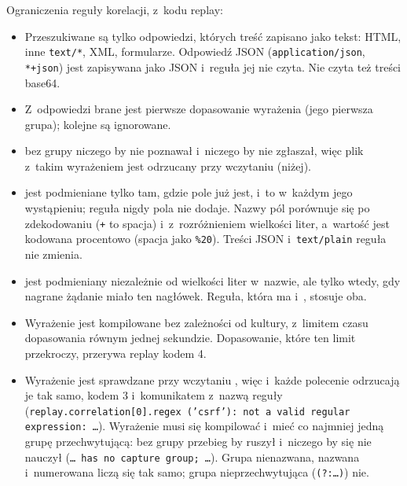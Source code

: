 Ograniczenia reguły korelacji, z~kodu replay:
\begin{itemize}
  \item Przeszukiwane są tylko odpowiedzi, których treść zapisano jako tekst: HTML, inne
        \texttt{text/*}, XML, formularze. Odpowiedź JSON (\texttt{application/json},
        \texttt{*+json}) jest zapisywana jako JSON i~reguła jej nie czyta. Nie czyta też
        treści base64.
  \item Z~odpowiedzi brane jest pierwsze dopasowanie wyrażenia (jego pierwsza grupa);
        kolejne są ignorowane.
  \item {} bez grupy niczego by nie poznawał i~niczego by nie zgłaszał, więc
        plik z~takim wyrażeniem jest odrzucany przy wczytaniu (niżej).
  \item {} jest podmieniane tylko tam, gdzie pole już jest, i~to w~każdym
        jego wystąpieniu; reguła nigdy pola nie dodaje. Nazwy pól porównuje się po
        zdekodowaniu (\texttt{+} to spacja) i~z~rozróżnieniem wielkości liter, a~wartość
        jest kodowana procentowo (spacja jako \texttt{\%20}). Treści JSON
        i~\texttt{text/plain} reguła nie zmienia.
  \item {} jest podmieniany niezależnie od wielkości liter w~nazwie, ale
        tylko wtedy, gdy nagrane żądanie miało ten nagłówek. Reguła, która ma
         i~, stosuje oba.
  \item Wyrażenie jest kompilowane bez zależności od kultury, z~limitem czasu dopasowania
        równym jednej sekundzie. Dopasowanie, które ten limit przekroczy, przerywa replay
        kodem 4.
  \item Wyrażenie jest sprawdzane przy wczytaniu , więc
         i~każde polecenie odrzucają je tak samo, kodem 3
        i~komunikatem z~nazwą reguły (\texttt{replay.correlation[0].regex ('csrf'): not a
        valid regular expression: …}). Wyrażenie musi się kompilować i~mieć co najmniej jedną
        grupę przechwytującą: bez grupy przebieg by ruszył i~niczego by się nie nauczył
        (\texttt{… has no capture group; …}). Grupa nienazwana, nazwana i~numerowana liczą
        się tak samo; grupa nieprzechwytująca (\texttt{(?:…)}) nie.
\end{itemize}


